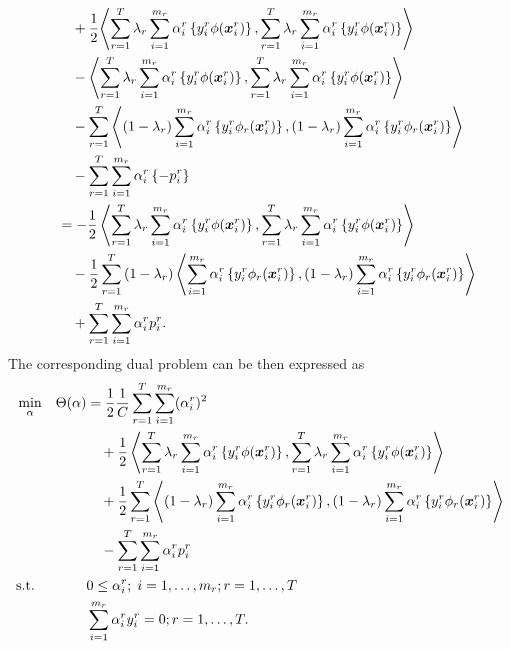 \begin{equation}
\begin{aligned}
        &\qquad + \frac{1}{2} {\left\langle \sum_{r= 1}^T \lambda_r \sum_{i=1}^{m_r} {\alpha_i^r} \left\lbrace y_i^r \phi(\bm{x}_i^r) \right\rbrace, \sum_{r= 1}^T \lambda_r \sum_{i=1}^{m_r} {\alpha_i^r} \left\lbrace y_i^r \phi(\bm{x}_i^r) \right\rbrace \right\rangle} \\
        &\qquad - \left\langle  \sum_{r= 1}^T \lambda_r \sum_{i=1}^{m_r} {\alpha_i^r} \left\lbrace y_i^r \phi(\bm{x}_i^r) \right\rbrace,  \sum_{r= 1}^T \lambda_r \sum_{i=1}^{m_r} {\alpha_i^r} \left\lbrace y_i^r \phi(\bm{x}_i^r) \right\rbrace \right\rangle \\
        &\qquad -  \sum_{r= 1}^T {\left\langle (1-\lambda_r) \sum_{i=1}^{m_r} {\alpha_i^r} \left\lbrace y_i^r \phi_r(\bm{x}_i^r) \right\rbrace, (1-\lambda_r) \sum_{i=1}^{m_r} {\alpha_i^r} \left\lbrace y_i^r \phi_r(\bm{x}_i^r) \right\rbrace \right\rangle} \\
        &\qquad -  \sum_{r= 1}^T \sum_{i=1}^{m_r} \alpha_i^r \left\lbrace - p_{i}^r  \right\rbrace \\
        &\quad= - \frac{1}{2} \left\langle  \sum_{r= 1}^T  \lambda_r \sum_{i=1}^{m_r} {\alpha_i^r} \left\lbrace y_i^r \phi(\bm{x}_i^r) \right\rbrace,  \sum_{r= 1}^T \lambda_r \sum_{i=1}^{m_r} {\alpha_i^r} \left\lbrace y_i^r \phi(\bm{x}_i^r) \right\rbrace \right\rangle \\
        &\qquad - \frac{1}{2} \sum_{r= 1}^T {(1-\lambda_r) \left\langle \sum_{i=1}^{m_r} {\alpha_i^r} \left\lbrace y_i^r \phi_r(\bm{x}_i^r) \right\rbrace, (1-\lambda_r) \sum_{i=1}^{m_r} {\alpha_i^r} \left\lbrace y_i^r \phi_r(\bm{x}_i^r) \right\rbrace \right\rangle} \\
        &\qquad +  \sum_{r= 1}^T \sum_{i=1}^{m_r} \alpha_i^r  p_{i}^r .
    \end{aligned}
\end{equation}
The corresponding dual problem can be then expressed as
\begin{equation}\label{eq:svmmtl_dual_conv_l2}
    \begin{aligned}
    & \min_{\alpha} & \Theta(\alpha) &= \frac{1}{2} \frac{1}{C} \sum_{r=1}^\ntasks \sum_{i=1}^{\npertask_r} (\alpha_i^r)^2 \\
    & & &\quad+\frac{1}{2} \dotp{\sum_{r= 1}^\ntasks \lambda_r \sum_{i=1}^{m_r} {\alpha_i^r} \left\lbrace y_i^r \phi(\fv{x}_i^r) \right\rbrace}{\sum_{r= 1}^\ntasks \lambda_r \sum_{i=1}^{m_r} {\alpha_i^r} \left\lbrace y_i^r \phi(\fv{x}_i^r) \right\rbrace} \\
    & & &\quad+  \frac{1}{2} \sum_{r= 1}^T {\dotp{(1 - \lambda_r)\sum_{i=1}^{m_r} {\alpha_i^r} \left\lbrace y_i^r \phi_r(\fv{x}_i^r) \right\rbrace}{(1 - \lambda_r) \sum_{i=1}^{m_r} {\alpha_i^r} \left\lbrace y_i^r \phi_r(\fv{x}_i^r) \right\rbrace}} \\
    & & &\quad - \sum_{r=1}^\ntasks \sum_{i=1}^{\npertask_r} \alpha_i^r p_i^r \\
    & \text{s.t.}
    & & 0 \leq \alpha_i^r ; \; i=1, \ldots, m_r; r=1, \ldots, \ntasks \\
    & & & \sum_{i=1}^{m_r} \alpha_i^r y_i^r = 0;  r=1, \ldots, \ntasks . \\
    \end{aligned}
\end{equation}
